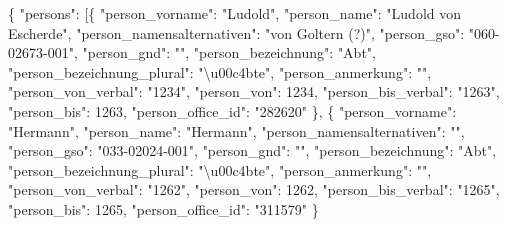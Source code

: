 \documentclass[12pt,ngerman,]{article}
\newenvironment{Shaded}{}{}
\newcommand{\DataTypeTok}[1]{\textcolor[rgb]{0.56,0.13,0.00}{#1}}
\newcommand{\DecValTok}[1]{\textcolor[rgb]{0.25,0.63,0.44}{#1}}
\newcommand{\CharTok}[1]{\textcolor[rgb]{0.25,0.44,0.63}{#1}}
\newcommand{\StringTok}[1]{\textcolor[rgb]{0.25,0.44,0.63}{#1}}
\newcommand{\OtherTok}[1]{\textcolor[rgb]{0.00,0.44,0.13}{#1}}
\newcommand{\FunctionTok}[1]{\textcolor[rgb]{0.02,0.16,0.49}{#1}}
\begin{document}
\begin{Shaded}
\begin{Highlighting}[]
\FunctionTok{\{}
    \DataTypeTok{"persons"}\FunctionTok{:} \OtherTok{[}\FunctionTok{\{}
        \DataTypeTok{"person_vorname"}\FunctionTok{:} \StringTok{"Ludold"}\FunctionTok{,}
        \DataTypeTok{"person_name"}\FunctionTok{:} \StringTok{"Ludold von Escherde"}\FunctionTok{,}
        \DataTypeTok{"person_namensalternativen"}\FunctionTok{:} \StringTok{"von Goltern (?)"}\FunctionTok{,}
        \DataTypeTok{"person_gso"}\FunctionTok{:} \StringTok{"060-02673-001"}\FunctionTok{,}
        \DataTypeTok{"person_gnd"}\FunctionTok{:} \StringTok{""}\FunctionTok{,}
        \DataTypeTok{"person_bezeichnung"}\FunctionTok{:} \StringTok{"Abt"}\FunctionTok{,}
        \DataTypeTok{"person_bezeichnung_plural"}\FunctionTok{:} \StringTok{"}\CharTok{\textbackslash{}u00c4}\StringTok{bte"}\FunctionTok{,}
        \DataTypeTok{"person_anmerkung"}\FunctionTok{:} \StringTok{""}\FunctionTok{,}
        \DataTypeTok{"person_von_verbal"}\FunctionTok{:} \StringTok{"1234"}\FunctionTok{,}
        \DataTypeTok{"person_von"}\FunctionTok{:} \DecValTok{1234}\FunctionTok{,}
        \DataTypeTok{"person_bis_verbal"}\FunctionTok{:} \StringTok{"1263"}\FunctionTok{,}
        \DataTypeTok{"person_bis"}\FunctionTok{:} \DecValTok{1263}\FunctionTok{,}
        \DataTypeTok{"person_office_id"}\FunctionTok{:} \StringTok{"282620"}
    \FunctionTok{\}}\OtherTok{,} \FunctionTok{\{}
        \DataTypeTok{"person_vorname"}\FunctionTok{:} \StringTok{"Hermann"}\FunctionTok{,}
        \DataTypeTok{"person_name"}\FunctionTok{:} \StringTok{"Hermann"}\FunctionTok{,}
        \DataTypeTok{"person_namensalternativen"}\FunctionTok{:} \StringTok{""}\FunctionTok{,}
        \DataTypeTok{"person_gso"}\FunctionTok{:} \StringTok{"033-02024-001"}\FunctionTok{,}
        \DataTypeTok{"person_gnd"}\FunctionTok{:} \StringTok{""}\FunctionTok{,}
        \DataTypeTok{"person_bezeichnung"}\FunctionTok{:} \StringTok{"Abt"}\FunctionTok{,}
        \DataTypeTok{"person_bezeichnung_plural"}\FunctionTok{:} \StringTok{"}\CharTok{\textbackslash{}u00c4}\StringTok{bte"}\FunctionTok{,}
        \DataTypeTok{"person_anmerkung"}\FunctionTok{:} \StringTok{""}\FunctionTok{,}
        \DataTypeTok{"person_von_verbal"}\FunctionTok{:} \StringTok{"1262"}\FunctionTok{,}
        \DataTypeTok{"person_von"}\FunctionTok{:} \DecValTok{1262}\FunctionTok{,}
        \DataTypeTok{"person_bis_verbal"}\FunctionTok{:} \StringTok{"1265"}\FunctionTok{,}
        \DataTypeTok{"person_bis"}\FunctionTok{:} \DecValTok{1265}\FunctionTok{,}
        \DataTypeTok{"person_office_id"}\FunctionTok{:} \StringTok{"311579"}
    \FunctionTok{\}}
\end{Highlighting}
\end{Shaded}
\end{document}
